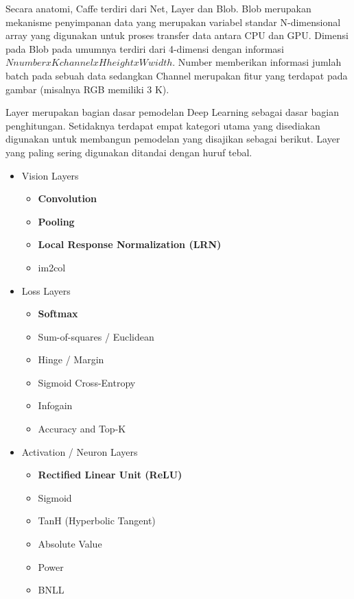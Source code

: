 Secara anatomi, Caffe terdiri dari Net, Layer dan Blob. Blob merupakan mekanisme penyimpanan data yang merupakan variabel standar N-dimensional array yang digunakan untuk proses transfer data antara CPU dan GPU. Dimensi pada Blob pada umumnya terdiri dari 4-dimensi dengan informasi $N number x K channel x H height x W width$. Number memberikan informasi jumlah batch pada sebuah data sedangkan Channel merupakan fitur yang terdapat pada gambar (misalnya RGB memiliki 3 K).

Layer merupakan bagian dasar pemodelan Deep Learning sebagai dasar bagian penghitungan. Setidaknya terdapat empat kategori utama yang disediakan digunakan untuk membangun pemodelan yang disajikan sebagai berikut. Layer yang paling sering digunakan ditandai dengan huruf tebal.

\begin{itemize}
 \item Vision Layers
 \begin{itemize}
  \item \textbf{Convolution}
  \item \textbf{Pooling}
  \item \textbf{Local Response Normalization (LRN)}
  \item im2col
 \end{itemize}

 \item Loss Layers
 \begin{itemize}
  \item \textbf{Softmax}
  \item Sum-of-squares / Euclidean
  \item Hinge / Margin
  \item Sigmoid Cross-Entropy
  \item Infogain
  \item Accuracy and Top-K
 \end{itemize}
 
 \item Activation / Neuron Layers
  \begin{itemize}
  \item \textbf{Rectified Linear Unit (ReLU)}
  \item Sigmoid
  \item TanH (Hyperbolic Tangent)
  \item Absolute Value
  \item Power
  \item BNLL
 \end{itemize}
 

\end{itemize}
